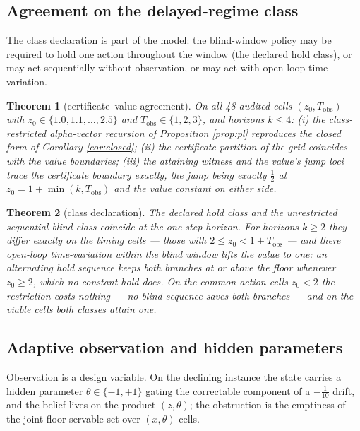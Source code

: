 \documentclass[10pt,twocolumn]{article}
\theoremstyle{plain}
\newtheorem{theorem}{Theorem}
\theoremstyle{definition}
\theoremstyle{remark}
\begin{document}
\subsection{Agreement on the delayed-regime class}\label{agreement}

The class declaration is part of the model: the blind-window policy may
be required to hold one action throughout the window (the declared hold
class), or may act sequentially without observation, or may act with
open-loop time-variation.

\begin{theorem}[certificate--value agreement]\label{thm:agree}
On all 48 audited cells \((z_{0}, T_{\mathrm{obs}})\) with
\(z_{0} \in \{1.0, 1.1, \dots, 2.5\}\) and
\(T_{\mathrm{obs}} \in \{1, 2, 3\}\), and horizons \(k \le 4\):
(i) the class-restricted alpha-vector recursion of Proposition
\ref{prop:pl} reproduces the closed form of Corollary \ref{cor:closed};
(ii) the certificate partition of the grid coincides with the value
boundaries; (iii) the attaining witness and the value's jump loci trace
the certificate boundary exactly, the jump being exactly
\(\tfrac{1}{2}\) at \(z_{0} = 1 + \min(k, T_{\mathrm{obs}})\) and the
value constant on either side.
\end{theorem}

\begin{theorem}[class declaration]\label{thm:class}
The declared hold class and the unrestricted sequential blind class
coincide at the one-step horizon. For horizons \(k \ge 2\) they
differ exactly on the timing cells --- those with
\(2 \le z_{0} < 1 + T_{\mathrm{obs}}\) --- and there open-loop
time-variation within the blind window lifts the value to one: an
alternating hold sequence keeps both branches at or above the floor
whenever \(z_{0} \ge 2\), which no constant hold does. On the
common-action cells \(z_{0} < 2\) the restriction costs nothing ---
no blind sequence saves both branches --- and on the viable cells both
classes attain one.
\end{theorem}

\subsection{Adaptive observation and hidden parameters}\label{adaptive}

Observation is a design variable. On the declining instance the state
carries a hidden parameter \(\theta \in \{-1, +1\}\) gating the
correctable component of a \(-\tfrac{1}{10}\) drift, and the belief
lives on the product \((z, \theta)\); the obstruction is the emptiness
of the joint floor-servable set over \((x, \theta)\) cells.
\end{document}
